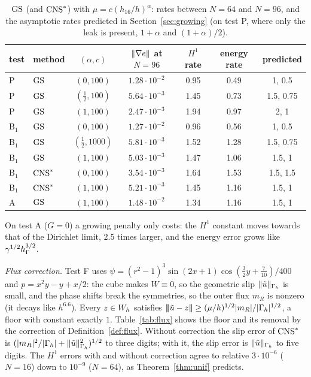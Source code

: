 \begin{table}[t]
\centering\small
\caption{$\mathrm{GS}$ (and $\mathrm{CNS}^\ast$) with $\mu=c(h_{16}/h)^\alpha$: rates between $N=64$ and $N=96$, and the asymptotic rates predicted in Section~\ref{sec:growing} (on test P, where only the leak is present, $1+\alpha$ and $(1+\alpha)/2$).}\label{tab:rescue}
\begin{tabular}{llccccc}
\toprule
test & method & $(\alpha,c)$ & $\lVert \nabla e\rVert$ at $N=96$ & $H^1$ rate & energy rate & predicted\\
\midrule
P & $\mathrm{GS}$ & $(0,100)$ & $1.28\cdot10^{-2}$ & 0.95 & 0.49 & 1, 0.5\\
P & $\mathrm{GS}$ & $(\frac12,100)$ & $5.64\cdot10^{-3}$ & 1.45 & 0.73 & 1.5, 0.75\\
P & $\mathrm{GS}$ & $(1,100)$ & $2.47\cdot10^{-3}$ & 1.94 & 0.97 & 2, 1\\
B$_1$ & $\mathrm{GS}$ & $(0,100)$ & $1.27\cdot10^{-2}$ & 0.96 & 0.56 & 1, 0.5\\
B$_1$ & $\mathrm{GS}$ & $(\frac12,1000)$ & $5.81\cdot10^{-3}$ & 1.52 & 1.28 & 1.5, 0.75\\
B$_1$ & $\mathrm{GS}$ & $(1,100)$ & $5.03\cdot10^{-3}$ & 1.47 & 1.06 & 1.5, 1\\
B$_1$ & $\mathrm{CNS}^\ast$ & $(0,100)$ & $3.54\cdot10^{-3}$ & 1.64 & 1.53 & 1.5, 1.5\\
B$_1$ & $\mathrm{CNS}^\ast$ & $(1,100)$ & $5.21\cdot10^{-3}$ & 1.45 & 1.16 & 1.5, 1\\
A & $\mathrm{GS}$ & $(1,100)$ & $1.48\cdot10^{-2}$ & 1.34 & 1.16 & 1.5, 1\\
\bottomrule
\end{tabular}
\end{table} On test A ($G=0$) a growing penalty only costs: the $H^1$ constant moves towards that of the Dirichlet limit, $2.5$ times larger, and the energy error grows like $\gamma^{1/2}h_\Gamma^{3/2}$.

\emph{Flux correction.} Test F uses $\psi=(r^2-1)^3\sin(2x+1)\cos(\frac32y+\frac7{10})/400$ and $p=x^2y-y+x/2$: the cube makes $W\equiv0$, so the geometric slip $\lVert \tilde u\rVert_{\Gamma_h}$ is small, and the phase shifts break the symmetries, so the outer flux $m_R$ is nonzero (it decays like $h^{6.6}$). Every $z\in W_h$ satisfies $|\!|\!|\tilde u-z|\!|\!|\ge(\mu/h)^{1/2}|m_R|/|\Gamma_h|^{1/2}$, a floor with constant exactly $1$. Table~\ref{tab:flux} shows the floor and its removal by the correction of Definition~\ref{def:flux}. Without correction the slip error of $\mathrm{CNS}^\ast$ is $(|m_R|^2/|\Gamma_h|+\lVert \tilde u\rVert^2_{\Gamma_h})^{1/2}$ to three digits; with it, the slip error is $\lVert \tilde u\rVert_{\Gamma_h}$ to five digits. The $H^1$ errors with and without correction agree to relative $3\cdot10^{-6}$ ($N=16$) down to $10^{-9}$ ($N=64$), as Theorem~\ref{thm:unif} predicts.

